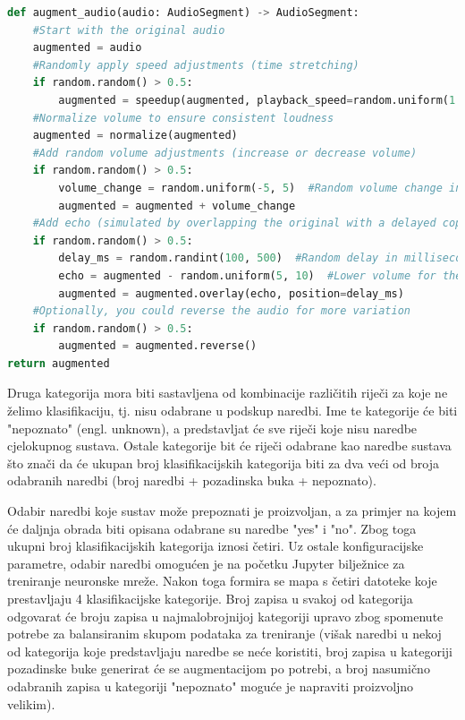 \begin{lstlisting}[language=Python, caption=Augmentacija zvuka, label=code:augmentation]
def augment_audio(audio: AudioSegment) -> AudioSegment:
    #Start with the original audio
    augmented = audio
    #Randomly apply speed adjustments (time stretching)
    if random.random() > 0.5:
        augmented = speedup(augmented, playback_speed=random.uniform(1.1, 1.5))
    #Normalize volume to ensure consistent loudness
    augmented = normalize(augmented)
    #Add random volume adjustments (increase or decrease volume)
    if random.random() > 0.5:
        volume_change = random.uniform(-5, 5)  #Random volume change in dB
        augmented = augmented + volume_change
    #Add echo (simulated by overlapping the original with a delayed copy)
    if random.random() > 0.5:
        delay_ms = random.randint(100, 500)  #Random delay in milliseconds
        echo = augmented - random.uniform(5, 10)  #Lower volume for the echo
        augmented = augmented.overlay(echo, position=delay_ms)
    #Optionally, you could reverse the audio for more variation
    if random.random() > 0.5:
        augmented = augmented.reverse()
return augmented
\end{lstlisting}


Druga kategorija mora biti sastavljena od kombinacije različitih riječi za koje
ne želimo klasifikaciju, tj. nisu odabrane u podskup naredbi. Ime te kategorije
će biti "nepoznato" (engl. unknown), a predstavljat će sve riječi koje nisu
naredbe cjelokupnog sustava. Ostale kategorije bit će riječi odabrane kao naredbe
sustava što  znači da će ukupan broj klasifikacijskih kategorija biti za dva veći 
od broja odabranih naredbi (broj naredbi + pozadinska buka + nepoznato).

Odabir naredbi koje sustav može prepoznati je proizvoljan, a za primjer na kojem
će daljnja obrada biti opisana odabrane su naredbe "yes" i "no". Zbog toga ukupni broj
klasifikacijskih kategorija iznosi četiri. Uz ostale konfiguracijske parametre,
odabir naredbi omogućen je na početku Jupyter bilježnice za treniranje neuronske mreže.
Nakon toga formira se mapa s četiri datoteke koje prestavljaju 4 klasifikacijske kategorije.
Broj zapisa u svakoj od kategorija odgovarat će broju zapisa u najmalobrojnijoj 
kategoriji upravo zbog spomenute potrebe za balansiranim skupom podataka za treniranje
(višak naredbi u nekoj od kategorija koje predstavljaju naredbe se neće koristiti, broj
zapisa u kategoriji pozadinske buke generirat će se augmentacijom po potrebi, a broj
nasumično odabranih zapisa u kategoriji "nepoznato" moguće je napraviti proizvoljno
velikim).

